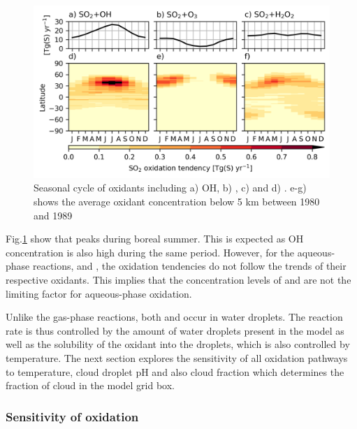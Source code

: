 \begin{figure}
    \centering
    \includegraphics[width=\linewidth]{Chapter4/Figs/seasonal_oxidation_w_summary_histsst_1980.png}
    \caption[Seasonal cycle of oxidants]{Seasonal cycle of oxidants including a) OH, b) , c)  and d) . e-g) shows the average oxidant concentration below 5 km between 1980 and 1989 }
    \label{fig:ch4:seasonal-oxidation}
\end{figure}

Fig.\ref{fig:ch4:seasonal-oxidation} show that  peaks during boreal summer. This is expected as OH concentration is also high during the same period. However, for the aqueous-phase reactions,  and , the oxidation tendencies do not follow the trends of their respective oxidants. This implies that the concentration levels of  and  are not the limiting factor for aqueous-phase oxidation. 



Unlike the gas-phase reactions, both  and  occur in water droplets. The reaction rate is thus controlled by the amount of water droplets present in the model as well as the solubility of the oxidant into the droplets, which is also controlled by temperature. The next section explores the sensitivity of all oxidation pathways to temperature, cloud droplet pH and also cloud fraction which determines the fraction of cloud in the model grid box.



\subsubsection{Sensitivity of  oxidation}

